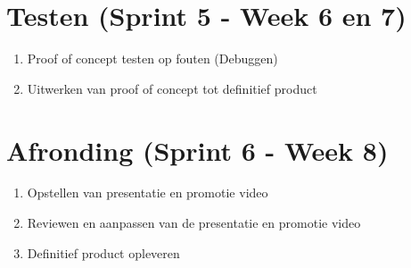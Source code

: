 \section{Testen (Sprint 5 - Week 6 en 7)} \label{sec:testen}
\begin{enumerate}
  \item Proof of concept testen op fouten (Debuggen)
  \item Uitwerken van proof of concept tot definitief product
\end{enumerate}
\section{Afronding (Sprint 6 - Week 8)} \label{sec:afronding}
\begin{enumerate}
  \item Opstellen van presentatie en promotie video
  \item Reviewen en aanpassen van de presentatie en promotie video
  \item Definitief product opleveren
\end{enumerate}
